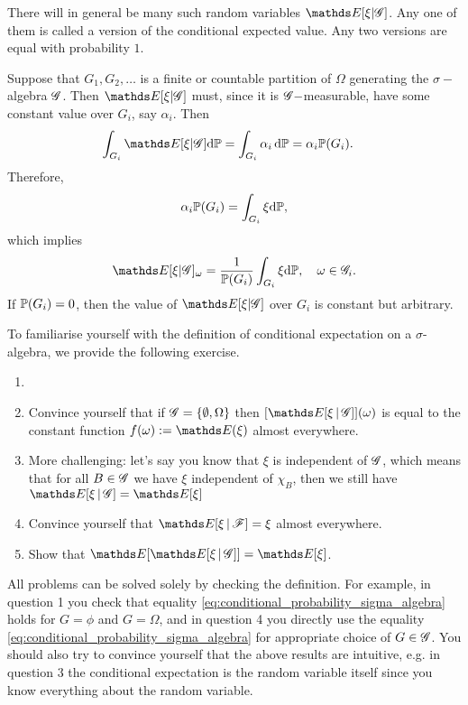 There will in general be many such random variables $\E[\xi | \G]$. Any one of them is called a version of the conditional expected value. Any two versions are equal with probability $1$.

\begin{example}
Suppose that $G_1, G_2, \dots$ is a finite or countable partition of $\Omega$ generating the $\sigma-$algebra $\mathcal{G}$. Then $\E[\xi | \G]$ must, since it is $\mathcal{G}-$measurable, have some constant value over $G_i$, say $\alpha_i$. Then
\begin{align}
    \int_{G_i} \E[\xi | \G] \d \p &= \int_{G_i} \alpha_i \, \d \p = \alpha_i \p(G_i).
\end{align}
Therefore,
\begin{equation}
    \alpha_i \mathbb{P} (G_i) = \int_{G_i} \xi \mathrm{d} \mathbb{P},
\end{equation}
which implies
\begin{equation}
    \E[\xi | \G]_\omega = \frac{1}{\p(G_i)} \int_{G_i} \xi \d \p, \quad \omega \in \G_i.
\end{equation}
If $\mathbb{P}(G_i) = 0$, then the value of $\E[\xi | \G]$ over $G_i$ is constant but arbitrary.
\end{example}

To familiarise yourself with the definition of conditional expectation on a $\sigma$-algebra, we provide the following exercise.
\begin{exercise} \label{ex:tower_property}
\begin{enumerate}
    \item[]
    \item Convince yourself that if $\mathcal{G} = \left\{ \emptyset, \Omega \right \}$ then $[\E[\xi\,|\,\G]](\omega)$ is equal to the constant function $f(\omega) := \E(\xi)$ almost everywhere.
    \item More challenging: let's say you know that $\xi$ is independent of $\mathcal{G}$, which means that for all $B \in \mathcal{G}$ we have $\xi$ independent of $\chi_B$, then we still have $\E[\xi\,|\,\G] = \E[\xi]$
    \item Convince yourself that $\E[\xi \,|\, \F] = \xi$ almost everywhere.
    \item Show that $\E[\E[\xi \,|\, \G]] = \E[\xi]$.
\end{enumerate}
\end{exercise}

\begin{hint}
All problems can be solved solely by checking the definition. For example, in question 1 you check that equality \eqref{eq:conditional_probability_sigma_algebra} holds for $G = \phi$ and $G = \Omega$, and in question 4 you directly use the equality \eqref{eq:conditional_probability_sigma_algebra} for appropriate choice of $G \in \mathcal{G}$. You should also try to convince yourself that the above results are intuitive, e.g. in question 3 the conditional expectation is the random variable itself since you know everything about the random variable.
\end{hint}

